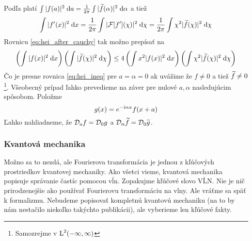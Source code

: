 \begin{dokaz}
    Podľa  platí
    $\int |f(a)|^2 \; \mathrm{d} a = \frac{1}{2\pi} \int |\widetilde{f}(\alpha)|^2 \; \mathrm{d}
    \alpha$ a tiež 
    \begin{equation}
        \int |f'(x)|^2 \; \mathrm{d} x = \frac{1}{2 \pi}
            \int |\mathcal{F}[f'](\chi)|^2 \; \mathrm{d} \chi = 
            \frac{1}{2 \pi} \int \chi^2 |\widetilde{f}(\chi)|^2 \; \mathrm{d} \chi
    \end{equation}
    Rovnicu \ref{eq:hei_after_cauchy} tak možno prepísať na
    \begin{equation}
        \left( \int |f(x)|^2 \; \mathrm{d} x \right)
        \left( \int |\widetilde{f}(\chi)|^2 \; \mathrm{d} \chi \right)
        \le 4
        \left(\int x^2 |f(x)|^2 \; \mathrm{d} x \right)
        \left(\int \chi^2 |\widetilde{f}(\chi)|^2 \; \mathrm{d} \chi\right)
    \end{equation}
    Čo je presne rovnica \ref{eq:hei_ineq} pre $a=\alpha=0$ ak uvážime že
    $f\not=0$ a tiež $\widetilde{f}\not=0$ \footnote{Samozrejme v $\mbox{L}^2(-\infty,\infty)$}.
    Všeobecný prípad ľahko prevedieme na záver pre nulové $a,\alpha$
    nasledujúcim spôsobom.
    Položme
    \begin{equation}
        g(x) = e^{-\hat{\imath} \alpha x} f(x + a)
    \end{equation}
     Ľahko nahliadneme, že $\mathcal{D}_{a} f = \mathcal{D}_{0}g$ a 
    $\mathcal{D}_{\alpha}\widetilde{f} = \mathcal{D}_{0}\widetilde{g}$.
\end{dokaz}

\subsubsection{Kvantová mechanika}
Možno sa to nezdá, ale Fourierova transformácia je jednou z kľúčových
prostriedkov kvantovej mechaniky. Ako všetci vieme, kvantová mechanika
popisuje správanie častíc pomocou vĺn. Zopakujme kľúčové slovo VĹN.
Nie je nič prirodzenejšie ako používať Fourierovu transformáciu na
vlny. Ale vráťme sa späť k formalizmu. Nebudeme popisovať kompletnú
kvantovú mechaniku (na to by nám nestačilo niekoľko takýchto
publikácii), ale vyberieme len kľúčové fakty.

